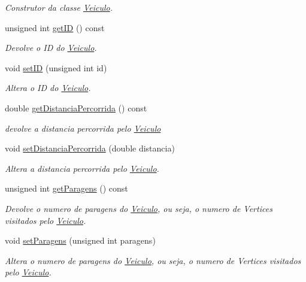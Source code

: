 \begin{DoxyCompactItemize}
\begin{DoxyCompactList}\small\item\em Construtor da classe \hyperlink{class_veiculo}{Veiculo}. \end{DoxyCompactList}\item 
unsigned int \hyperlink{class_veiculo_a262beacd60d26ee80769022c7c761d0e}{get\-I\-D} () const 
\begin{DoxyCompactList}\small\item\em Devolve o I\-D do \hyperlink{class_veiculo}{Veiculo}. \end{DoxyCompactList}\item 
void \hyperlink{class_veiculo_ac92dc4b87fdadfd6b28f44e01c19e23e}{set\-I\-D} (unsigned int id)
\begin{DoxyCompactList}\small\item\em Altera o I\-D do \hyperlink{class_veiculo}{Veiculo}. \end{DoxyCompactList}\item 
double \hyperlink{class_veiculo_ac2565051ae08d343dc5b1c58ec4376f4}{get\-Distancia\-Percorrida} () const 
\begin{DoxyCompactList}\small\item\em devolve a distancia percorrida pelo \hyperlink{class_veiculo}{Veiculo} \end{DoxyCompactList}\item 
void \hyperlink{class_veiculo_ab11ffc8cc36fa474dfa1bb7487b224d3}{set\-Distancia\-Percorrida} (double distancia)
\begin{DoxyCompactList}\small\item\em Altera a distancia percorrida pelo \hyperlink{class_veiculo}{Veiculo}. \end{DoxyCompactList}\item 
unsigned int \hyperlink{class_veiculo_a81b404875383f452de361230537baa2e}{get\-Paragens} () const 
\begin{DoxyCompactList}\small\item\em Devolve o numero de paragens do \hyperlink{class_veiculo}{Veiculo}, ou seja, o numero de Vertices visitados pelo \hyperlink{class_veiculo}{Veiculo}. \end{DoxyCompactList}\item 
void \hyperlink{class_veiculo_a010fac29bd8d7d9c5a2cb819db824f27}{set\-Paragens} (unsigned int paragens)
\begin{DoxyCompactList}\small\item\em Altera o numero de paragens do \hyperlink{class_veiculo}{Veiculo}, ou seja, o numero de Vertices visitados pelo \hyperlink{class_veiculo}{Veiculo}. \end{DoxyCompactList}\item 

\end{DoxyCompactItemize}
